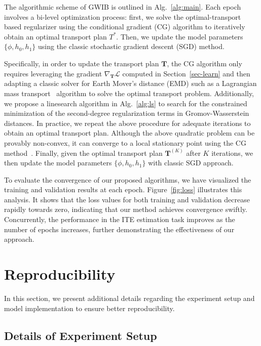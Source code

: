 \documentclass{article}
\begin{document}
The algorithmic scheme of GWIB is outlined in Alg.~\ref{alg:main}. Each epoch involves a bi-level optimization process: first, we solve the optimal-transport based regularizer using the conditional gradient (CG) algorithm to iteratively obtain an optimal transport plan $T^*$.
Then, we update the model parameters $\{\phi, h_0, h_1\}$ using the classic stochastic gradient descent (SGD) method.

Specifically, in order to update the transport plan $\bm{T}$, the CG algorithm only requires leveraging the gradient $\nabla_{\bm{T}}\mathcal{L}$ computed in Section~\ref{sec-learn} and then adapting a
classic solver for Earth Mover's distance (EMD) such as a Lagrangian mass transport~\cite{bonneel2011displacement} algorithm to solve the optimal transport problem. 
Additionally, we propose a linesearch algorithm in Alg.~\ref{alg:ls} to search for the constrained
minimization of the second-degree regularization terms in Gromov-Wasserstein distances. 
In practice, we repeat the above procedure for adequate iterations to obtain an optimal transport plan.
Although the above quadratic problem can be provably non-convex, it can converge to a local stationary point using the CG method~\cite{lacoste2016convergence}.
Finally, given the optimal transport plan $\bm{T}^{(K)}$ after $K$ iterations, we then update the model parameters $\{\phi, h_0, h_1\}$ with classic SGD approach.

To evaluate the convergence of our proposed algorithms, we have visualized the training and validation results at each epoch. 
Figure~\ref{fig:loss} illustrates this analysis. 
It shows that the loss values for both training and validation decrease rapidly towards zero, indicating that our method achieves convergence swiftly. 
Concurrently, the performance in the ITE estimation task improves as the number of epochs increases, further demonstrating the effectiveness of our approach.

\section{Reproducibility}
\label{sec:repro}
In this section, we present additional details regarding the experiment setup and model implementation to ensure better reproducibility.
\subsection{Details of Experiment Setup}
\label{appendix-setup}
\end{document}
